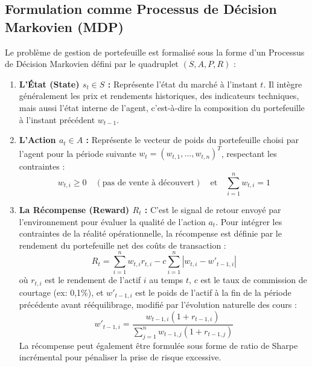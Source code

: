 \subsection{Formulation comme Processus de Décision Markovien (MDP)}
Le problème de gestion de portefeuille est formalisé sous la forme d'un Processus de Décision Markovien défini par le quadruplet $(S, A, P, R)$ :
\begin{enumerate}
    \item \textbf{L'État (State) $s_t \in S$ :} Représente l'état du marché à l'instant $t$. Il intègre généralement les prix et rendements historiques, des indicateurs techniques, mais aussi l'état interne de l'agent, c'est-à-dire la composition du portefeuille à l'instant précédent $w_{t-1}$.
    \item \textbf{L'Action $a_t \in A$ :} Représente le vecteur de poids du portefeuille choisi par l'agent pour la période suivante $w_t = (w_{t,1}, \dots, w_{t,n})^T$, respectant les contraintes :
    \begin{equation}
        w_{t,i} \ge 0 \quad (\text{pas de vente à découvert}) \quad \text{et} \quad \sum_{i=1}^{n} w_{t,i} = 1
    \end{equation}
    \item \textbf{La Récompense (Reward) $R_t$ :} C'est le signal de retour envoyé par l'environnement pour évaluer la qualité de l'action $a_t$. Pour intégrer les contraintes de la réalité opérationnelle, la récompense est définie par le rendement du portefeuille net des coûts de transaction :
    \begin{equation}
        R_t = \sum_{i=1}^{n} w_{t,i} r_{t,i} - c \sum_{i=1}^{n} |w_{t,i} - w'_{t-1,i}|
    \end{equation}
    où $r_{t,i}$ est le rendement de l'actif $i$ au temps $t$, $c$ est le taux de commission de courtage (ex: 0,1\%), et $w'_{t-1,i}$ est le poids de l'actif à la fin de la période précédente avant rééquilibrage, modifié par l'évolution naturelle des cours :
    \begin{equation}
        w'_{t-1,i} = \frac{w_{t-1,i}(1 + r_{t-1,i})}{\sum_{j=1}^{n} w_{t-1,j}(1 + r_{t-1,j})}
    \end{equation}
    La récompense peut également être formulée sous forme de ratio de Sharpe incrémental pour pénaliser la prise de risque excessive.
\end{enumerate}

